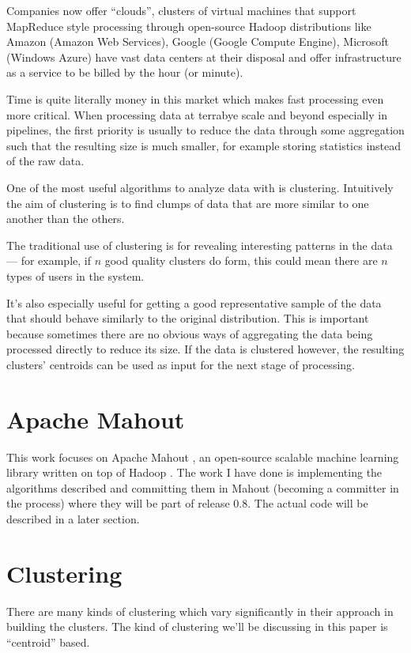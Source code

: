 \documentclass{article}
\begin{document}
Companies now offer ``clouds'', clusters of virtual machines that support
MapReduce style processing through open-source Hadoop distributions like Amazon
(Amazon Web Services), Google (Google Compute Engine), Microsoft (Windows
Azure) have vast data centers at their disposal and offer infrastructure as a
service to be billed by the hour (or minute).

Time is quite literally money in this market which makes fast processing even
more critical. When processing data at terrabye scale and beyond especially in
pipelines, the first priority is usually to reduce the data through some
aggregation such that the resulting size is much smaller, for example storing
statistics instead of the raw data.

One of the most useful algorithms to analyze data with is clustering.
Intuitively the aim of clustering is to find clumps of data that are more
similar to one another than the others.

The traditional use of clustering is for revealing interesting patterns in the
data --- for example, if $n$ good quality clusters do form, this could mean there
are $n$ types of users in the system.

It's also especially useful for getting a good representative sample of the data
that should behave similarly to the original distribution.
This is important because sometimes there are no obvious ways of aggregating the
data being processed directly to reduce its size. If the data is clustered
however, the resulting clusters' centroids can be used as input for the next
stage of processing.

\section{Apache Mahout}

This work focuses on Apache Mahout \cite{mahout}, an open-source scalable
machine learning library written on top of Hadoop \cite{hadoop}.
The work I have done is implementing the algorithms described and committing
them in Mahout (becoming a committer in the process) where they will be part of
release 0.8. The actual code will be described in a later section.

\section{Clustering}

There are many kinds of clustering which vary significantly in their approach
in building the clusters. The kind of clustering we'll be discussing in this
paper is ``centroid'' based.
\end{document}
